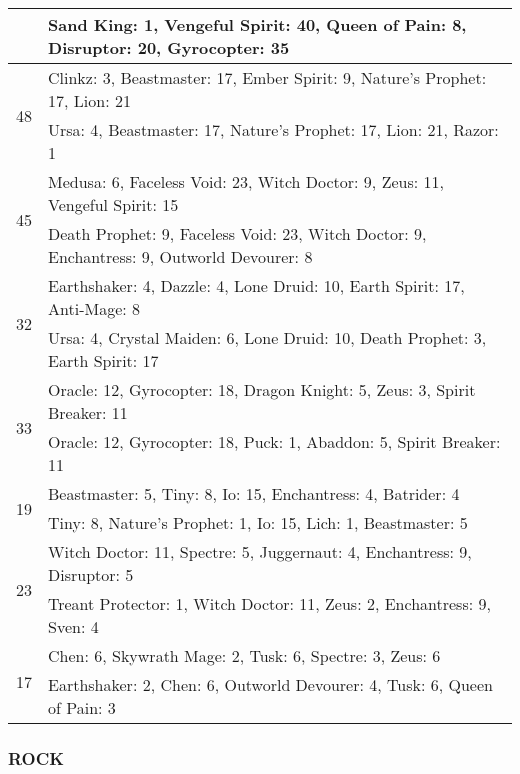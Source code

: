\documentclass[result.tex]{subfiles}
\begin{document}
\begin{table}[H]
\begin{tabular}{ | c | p{12.5cm} | }
    & Sand King: 1, Vengeful Spirit: 40, Queen of Pain: 8, Disruptor: 20, Gyrocopter: 35 \\
    \hline
    \multirow{2}{*}{48}
    & Clinkz: 3, Beastmaster: 17, Ember Spirit: 9, Nature's Prophet: 17, Lion: 21 \\
    & Ursa: 4, Beastmaster: 17, Nature's Prophet: 17, Lion: 21, Razor: 1 \\
    \hline
    \multirow{2}{*}{45}
    & Medusa: 6, Faceless Void: 23, Witch Doctor: 9, Zeus: 11, Vengeful Spirit: 15 \\
    & Death Prophet: 9, Faceless Void: 23, Witch Doctor: 9, Enchantress: 9, Outworld Devourer: 8 \\
    \hline
    \multirow{2}{*}{32}
    & Earthshaker: 4, Dazzle: 4, Lone Druid: 10, Earth Spirit: 17, Anti-Mage: 8 \\
    & Ursa: 4, Crystal Maiden: 6, Lone Druid: 10, Death Prophet: 3, Earth Spirit: 17 \\
    \hline
    \multirow{2}{*}{33}
    & Oracle: 12, Gyrocopter: 18, Dragon Knight: 5, Zeus: 3, Spirit Breaker: 11 \\
    & Oracle: 12, Gyrocopter: 18, Puck: 1, Abaddon: 5, Spirit Breaker: 11 \\
    \hline
    \multirow{2}{*}{19}
    & Beastmaster: 5, Tiny: 8, Io: 15, Enchantress: 4, Batrider: 4 \\
    & Tiny: 8, Nature's Prophet: 1, Io: 15, Lich: 1, Beastmaster: 5 \\
    \hline
    \multirow{2}{*}{23}
    & Witch Doctor: 11, Spectre: 5, Juggernaut: 4, Enchantress: 9, Disruptor: 5 \\
    & Treant Protector: 1, Witch Doctor: 11, Zeus: 2, Enchantress: 9, Sven: 4 \\
    \hline
    \multirow{2}{*}{17}
    & Chen: 6, Skywrath Mage: 2, Tusk: 6, Spectre: 3, Zeus: 6 \\
    & Earthshaker: 2, Chen: 6, Outworld Devourer: 4, Tusk: 6, Queen of Pain: 3 \\
    \hline
  \end{tabular}
  \caption{}
  \label{}
\end{table}

\newpage

\subsubsection*{ROCK}
\end{document}
